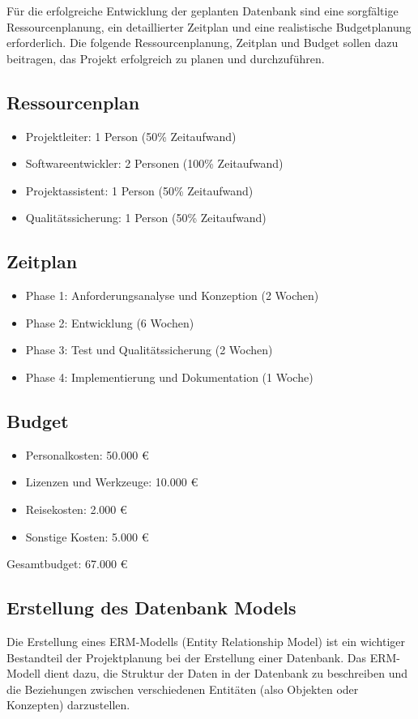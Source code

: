 
Für die erfolgreiche Entwicklung der geplanten Datenbank sind eine sorgfältige Ressourcenplanung, ein detaillierter Zeitplan und eine realistische Budgetplanung erforderlich.
Die folgende Ressourcenplanung, Zeitplan und Budget sollen dazu beitragen, das Projekt erfolgreich zu planen und durchzuführen.

\subsection{Ressourcenplan}
\begin{itemize}
    \item Projektleiter: 1 Person (50\% Zeitaufwand)
    \item Softwareentwickler: 2 Personen (100\% Zeitaufwand)
    \item Projektassistent: 1 Person (50\% Zeitaufwand)
    \item Qualitätssicherung: 1 Person (50\% Zeitaufwand)
\end{itemize}

\subsection{Zeitplan}
\begin{itemize}
    \item Phase 1: Anforderungsanalyse und Konzeption (2 Wochen)
    \item Phase 2: Entwicklung (6 Wochen)
    \item Phase 3: Test und Qualitätssicherung (2 Wochen)
    \item Phase 4: Implementierung und Dokumentation (1 Woche)
\end{itemize}

\subsection{Budget}
\begin{itemize}
    \item Personalkosten: 50.000 €
    \item Lizenzen und Werkzeuge: 10.000 €
    \item Reisekosten: 2.000 €
    \item Sonstige Kosten: 5.000 €
\end{itemize}
Gesamtbudget: 67.000 €

\subsection{Erstellung des Datenbank Models}
Die Erstellung eines ERM-Modells (Entity Relationship Model) ist ein wichtiger Bestandteil der Projektplanung bei der Erstellung einer Datenbank.
Das ERM-Modell dient dazu, die Struktur der Daten in der Datenbank zu beschreiben und die Beziehungen zwischen verschiedenen Entitäten (also Objekten oder Konzepten) darzustellen.\\

